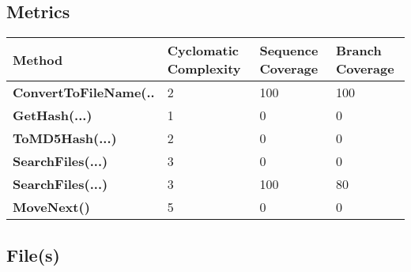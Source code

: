 \documentclass[a4paper,10pt]{article}
\begin{document}
\subsection{Metrics}
\begin{longtable}[l]{|l|l|l|l|}
\hline
\textbf{Method} & \textbf{Cyclomatic Complexity} & \textbf{Sequence Coverage} & \textbf{Branch Coverage}\\
\hline
\textbf{ConvertToFileName(..} & 2 & 100 & 100\\
\hline
\textbf{GetHash(...)} & 1 & 0 & 0\\
\hline
\textbf{ToMD5Hash(...)} & 2 & 0 & 0\\
\hline
\textbf{SearchFiles(...)} & 3 & 0 & 0\\
\hline
\textbf{SearchFiles(...)} & 3 & 100 & 80\\
\hline
\textbf{MoveNext()} & 5 & 0 & 0\\
\hline
\end{longtable}
\subsection{File(s)}
\end{document}
